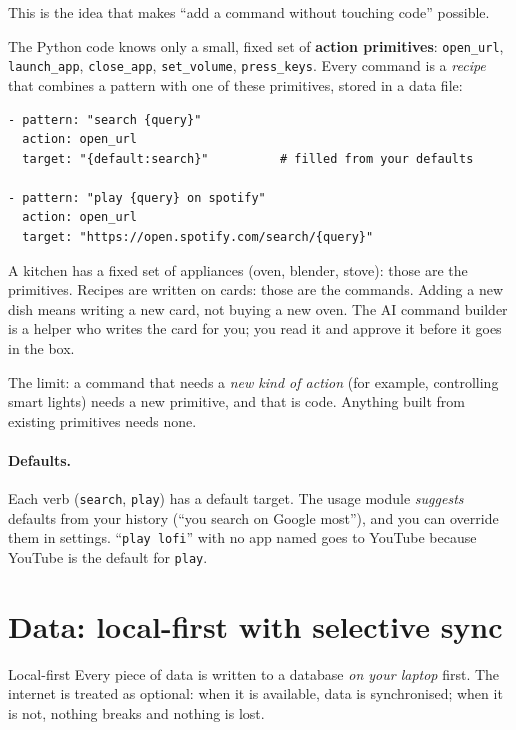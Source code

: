 \documentclass[11pt,a4paper]{article}
\begin{document}
This is the idea that makes ``add a command without touching code'' possible.

The Python code knows only a small, fixed set of \textbf{action primitives}:
\texttt{open\_url}, \texttt{launch\_app}, \texttt{close\_app}, \texttt{set\_volume},
\texttt{press\_keys}. Every command is a \emph{recipe} that combines a pattern with one of
these primitives, stored in a data file:

\begin{lstlisting}
- pattern: "search {query}"
  action: open_url
  target: "{default:search}"          # filled from your defaults

- pattern: "play {query} on spotify"
  action: open_url
  target: "https://open.spotify.com/search/{query}"
\end{lstlisting}

\begin{analogy}
A kitchen has a fixed set of appliances (oven, blender, stove): those are the primitives.
Recipes are written on cards: those are the commands. Adding a new dish means writing a new
card, not buying a new oven. The AI command builder is a helper who writes the card for you;
you read it and approve it before it goes in the box.
\end{analogy}

\begin{caution}
The limit: a command that needs a \emph{new kind of action} (for example, controlling smart
lights) needs a new primitive, and that is code. Anything built from existing primitives
needs none.
\end{caution}

\paragraph{Defaults.} Each verb (\texttt{search}, \texttt{play}) has a default target. The
usage module \emph{suggests} defaults from your history (``you search on Google most''),
and you can override them in settings. ``\texttt{play lofi}'' with no app named goes to
YouTube because YouTube is the default for \texttt{play}.

\section{Data: local-first with selective sync}

\begin{concept}{Local-first}
Every piece of data is written to a database \emph{on your laptop} first. The internet is
treated as optional: when it is available, data is synchronised; when it is not, nothing
breaks and nothing is lost.
\end{concept}
\end{document}
